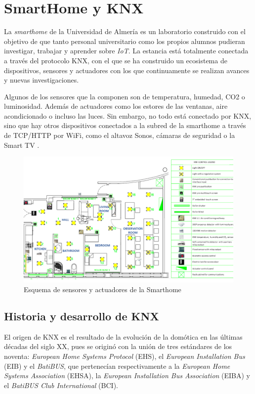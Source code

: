 \section{SmartHome y KNX}

La \textit{smarthome} de la Universidad de Almería es un laboratorio construido con el objetivo de que tanto personal universitario como los propios alumnos pudieran investigar, trabajar y aprender sobre \textit{IoT}. La estancia está totalmente conectada a través del protocolo KNX, con el que se ha construido un ecosistema de dispositivos, sensores y actuadores con los que continuamente se realizan avances y nuevas investigaciones.

Algunos de los sensores que la componen son de temperatura, humedad, CO2 o luminosidad. Además de actuadores como los estores de las ventanas, aire acondicionado o incluso las luces. Sin embargo, no todo está conectado por KNX, sino que hay otros dispositivos conectados a la subred de la smarthome a través de TCP/HTTP por WiFi, como el altavoz Sonos, cámaras de seguridad o la Smart TV \cite{intro_4}.

\begin{figure}
    \centering
    \includegraphics{imagenes/capitulo1/mapaSmarthome.png}
    \caption{Esquema de sensores y actuadores de la Smarthome}
    \label{fig:mapa_sensores}
\end{figure}

\subsection{Historia y desarrollo de KNX}

El origen de KNX es el resultado de la evolución de la domótica en las últimas décadas del siglo XX, pues se originó con la unión de tres estándares de los noventa: \textit{European Home Systems Protocol} (EHS), el \textit{European Installation Bus} (EIB) y el \textit{BatiBUS}, que pertenecían respectivamente a la \textit{European Home Systems Association} (EHSA), la \textit{European Installation Bus Association} (EIBA) y el \textit{BatiBUS Club International} (BCI).

